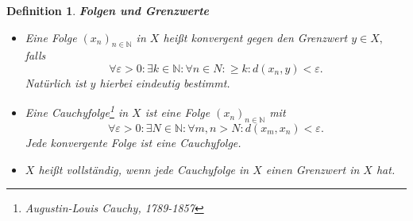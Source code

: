\documentclass[12pt]{scrbook}   %
\newtheorem{definiX}[alles]{Definition}
\newenvironment{defini}[1]{\begin{definiX}{\bf #1}\par\rm}{\end{definiX}}
\begin{document}
\begin{defini} {\bf Folgen und Grenzwerte}

{\rm 
\begin{itemize}
Es sei $(X,d)$ ein metrischer Raum. 
\item[a)]
Eine Folge $(x_n)_{n\in \mathbb N}$
in $X$ heißt {\it konvergent gegen den Grenzwert} $y\in X,$ falls
$$\forall \varepsilon > 0 : \exists k\in\mathbb N : \forall n \in N: \ge k: d(x_n,y)<\varepsilon.$$
Natürlich ist $y$ hierbei eindeutig bestimmt.
\item[b)] Eine Cauchyfolge\footnote{Augustin-Louis Cauchy, 1789-1857} in $X$ 
ist eine Folge $(x_n)_{n\in \mathbb N}$ mit
$$\forall \varepsilon>0 : \exists N\in \mathbb N: \forall m,n>N:
d(x_m,x_n) < \varepsilon.$$
Jede konvergente Folge ist eine Cauchyfolge.
\item[c)] $X$ heißt {\it vollständig}, wenn jede
Cauchyfolge in $X$ einen Grenzwert in $X$ hat.
\end{itemize}
}
\end{defini}
\end{document}

